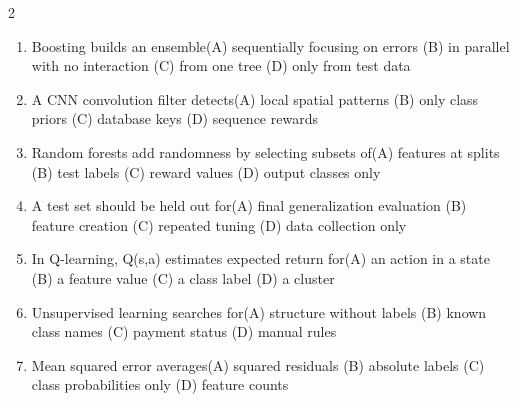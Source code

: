 \documentclass[a4paper]{article}
\begin{document}
\begin{multicols*}{2}
\begin{enumerate}
\item Boosting builds an ensemble\newline\hspace*{0.6em}(A) sequentially focusing on errors \quad (B) in parallel with no interaction \newline\hspace*{0.6em}(C) from one tree \quad (D) only from test data
\item A CNN convolution filter detects\newline\hspace*{0.6em}(A) local spatial patterns \quad (B) only class priors \newline\hspace*{0.6em}(C) database keys \quad (D) sequence rewards
\item Random forests add randomness by selecting subsets of\newline\hspace*{0.6em}(A) features at splits \quad (B) test labels \newline\hspace*{0.6em}(C) reward values \quad (D) output classes only
\item A test set should be held out for\newline\hspace*{0.6em}(A) final generalization evaluation \quad (B) feature creation \newline\hspace*{0.6em}(C) repeated tuning \quad (D) data collection only
\item In Q-learning, Q(s,a) estimates expected return for\newline\hspace*{0.6em}(A) an action in a state \quad (B) a feature value \newline\hspace*{0.6em}(C) a class label \quad (D) a cluster
\item Unsupervised learning searches for\newline\hspace*{0.6em}(A) structure without labels \quad (B) known class names \newline\hspace*{0.6em}(C) payment status \quad (D) manual rules
\item Mean squared error averages\newline\hspace*{0.6em}(A) squared residuals \quad (B) absolute labels \newline\hspace*{0.6em}(C) class probabilities only \quad (D) feature counts

\end{enumerate}
\end{multicols*}
\end{document}
